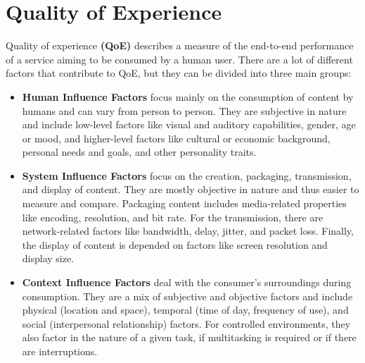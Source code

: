 \section{Quality of Experience}
Quality of experience \textbf{(QoE)} describes a measure of the end-to-end performance of a service aiming to be consumed by a human user. There are a lot of different factors that contribute to QoE, but they can be divided into three main groups: \cite{RBDML+14}

\begin{itemize}
	
	\item \textbf{Human Influence Factors} focus mainly on the consumption of content by humans and can vary from person to person. They are subjective in nature and include low-level factors like visual and auditory capabilities, gender, age or mood, and higher-level factors like cultural or economic background, personal needs and goals, and other personality traits. 
	
	
	\item \textbf{System Influence Factors} focus on the creation, packaging, transmission, and display of content. They are mostly objective in nature and thus easier to measure and compare. Packaging content includes media-related properties like encoding, resolution, and bit rate. For the transmission, there are network-related factors like bandwidth, delay, jitter, and packet loss. Finally, the display of content is depended on factors like screen resolution and display size.
	
	
	\item \textbf{Context Influence Factors} deal with the consumer's surroundings during consumption. They are a mix of subjective and objective factors and include physical (location and space), temporal (time of day, frequency of use), and social (interpersonal relationship) factors. For controlled environments, they also factor in the nature of a given task, if multitasking is required or if there are interruptions.
	
	
	
\end{itemize}

